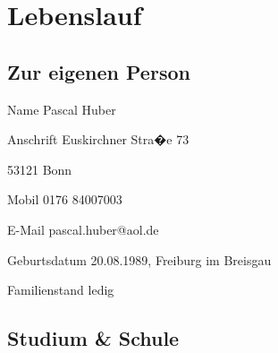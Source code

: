\documentclass[a4papers]{scrartcl}
\begin{document}
\section{Lebenslauf}




\subsection{Zur eigenen Person}

\begin{list}{}
{\setlength{\topsep}{1.0cm}
\setlength{\itemsep}{0cm}
\setlength{\leftmargin}{3.6cm}
\setlength{\labelwidth}{3.2cm}
\setlength{\labelsep}{0.4cm}
\renewcommand{\makelabel}[1]{\fontfamily{cmss}\fontseries{x}\fontshape{n}
\selectfont #1}}
\item[Name] Pascal Huber
\item[Anschrift] Euskirchner Stra�e 73
\item 53121 Bonn
\item[Mobil] 0176 84007003
\item[E-Mail] pascal.huber@aol.de
\item[Geburtsdatum] 20.08.1989, Freiburg im Breisgau
\item[Familienstand] ledig
\end{list}


\vspace{-2.5\baselineskip}
\subsection{Studium \& Schule}
\end{document}
